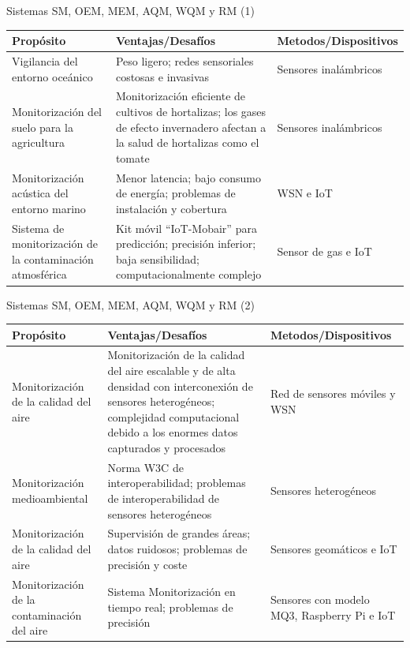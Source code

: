 \documentclass[aspectratio=169,compress]{beamer}
\begin{document}
\begin{frame}{Sistemas SM, OEM, MEM, AQM, WQM y RM (1)}
\begin{center}
\footnotesize
\begin{tabular}{p{4.5cm}|p{4.5cm}|p{4.5cm}}
\hline
\textbf{Propósito} & \textbf{Ventajas/Desafíos} & \textbf{Metodos/Dispositivos} \\
\hline
Vigilancia del entorno oceánico  &
Peso ligero; redes sensoriales costosas e invasivas &  
Sensores inalámbricos \\ \hline

Monitorización del suelo para la agricultura & 
Monitorización eficiente de cultivos de hortalizas; los gases de efecto invernadero afectan a la salud de hortalizas como el tomate & 
Sensores inalámbricos \\  \hline


Monitorización acústica del entorno marino &
Menor latencia; bajo consumo de energía; problemas de instalación y cobertura &
WSN e IoT \\  \hline


Sistema de monitorización de la contaminación atmosférica &
Kit móvil ``IoT-Mobair'' para predicción; precisión inferior; baja sensibilidad; computacionalmente complejo  &
Sensor de gas e IoT \\  \hline

\end{tabular}
\end{center}

\end{frame}


\begin{frame}{Sistemas SM, OEM, MEM, AQM, WQM y RM (2)}
\begin{center}
\footnotesize
\begin{tabular}{p{4.5cm}|p{4.5cm}|p{4.5cm}}
\hline
\textbf{Propósito} & \textbf{Ventajas/Desafíos} & \textbf{Metodos/Dispositivos} \\
\hline

Monitorización de la calidad del aire &
Monitorización de la calidad del aire escalable y de alta densidad con interconexión de sensores heterogéneos; complejidad computacional debido a los enormes datos capturados y procesados &
Red de sensores móviles y WSN  \\  \hline

Monitorización medioambiental &
Norma W3C de interoperabilidad; problemas de interoperabilidad de sensores heterogéneos &
Sensores heterogéneos \\  \hline

Monitorización de la calidad del aire &
Supervisión de grandes áreas; datos ruidosos; problemas de precisión y coste &
Sensores geomáticos e IoT \\  \hline

Monitorización de la contaminación del aire &
Sistema Monitorización en tiempo real; problemas de precisión  &
Sensores con modelo MQ3, Raspberry Pi e IoT \\  \hline


\end{tabular}
\end{center}

\end{frame}
\end{document}
